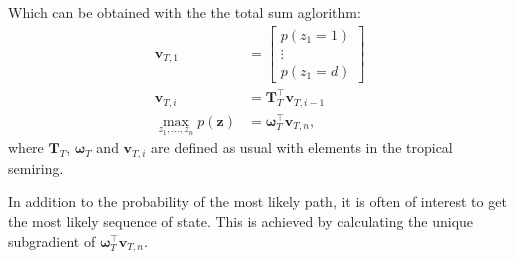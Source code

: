 Which can be obtained with the the total sum aglorithm:
\begin{align}
    \mathbf{v}_{T,1} &= \begin{bmatrix}
        p(z_1 = 1) \\
        \vdots \\
        p(z_1 = d)
    \end{bmatrix} \\
    \mathbf{v}_{T,i} &= \mathbf{T}_T^\top \mathbf{v}_{T,i-1} \\
    \max_{z_1, \dots, z_{n}} p(\mathbf{z}) &= \boldsymbol{\omega}_{T}^{\top}
        \mathbf{v}_{T,n},
    \label{eq:markovchains:totalsum_statemarginal}
\end{align}
where $\mathbf{T}_T$, $\boldsymbol{\omega}_T$ and $\mathbf{v}_{T,i}$ are
defined as usual with elements in the tropical semiring.

In addition to the probability of the most likely path, it is often
of interest to get the most likely sequence of state. This is achieved
by calculating the unique subgradient of
$\boldsymbol{\omega}^\top_T \mathbf{v}_{T,n}$.

